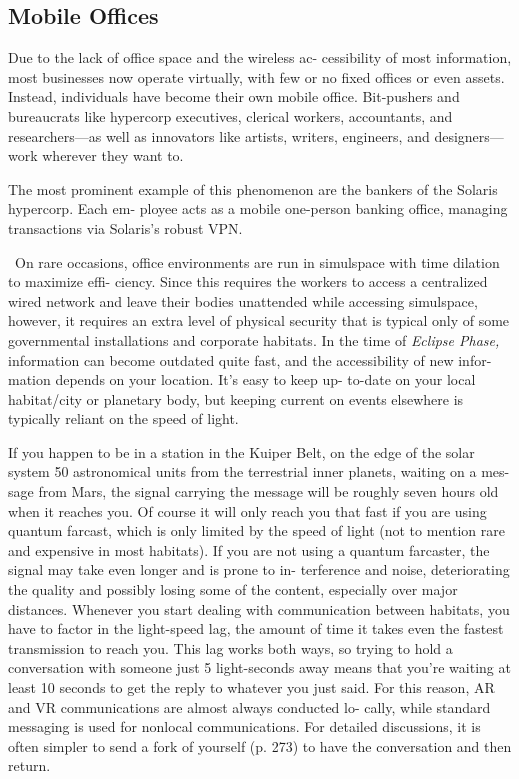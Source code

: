 \subsection{Mobile Offices}

Due to the lack of office space and the wireless ac-
cessibility of most information, most businesses 
now operate virtually, with few or no fixed offices 
or even assets. Instead, individuals have become their 
own mobile office. Bit-pushers and bureaucrats like 
hypercorp executives, clerical workers, accountants, 
and researchers—as well as innovators like artists, 
writers, engineers, and designers—work wherever 
they want to.

The most prominent example of this phenomenon 
are the bankers of the Solaris hypercorp. Each em-
ployee acts as a mobile one-person banking office, 
managing transactions via Solaris's robust VPN.

 On rare occasions, office environments are run 
in simulspace with time dilation to maximize effi-
ciency. Since this requires the workers to access a 
centralized wired network and leave their bodies 
unattended while accessing simulspace, however, it 
requires an extra level of physical security that is 
typical only of some governmental installations and 
corporate habitats.
In the time of \textit{Eclipse Phase,} information can become 
outdated quite fast, and the accessibility of new infor-
mation depends on your location. It's easy to keep up-
to-date on your local habitat/city or planetary body, 
but keeping current on events elsewhere is typically 
reliant on the speed of light.

If you happen to be in a station in the Kuiper Belt, 
on the edge of the solar system 50 astronomical units 
from the terrestrial inner planets, waiting on a mes-
sage from Mars, the signal carrying the message will 
be roughly seven hours old when it reaches you. Of 
course it will only reach you that fast if you are using 
quantum farcast, which is only limited by the speed 
of light (not to mention rare and expensive in most 
habitats). If you are not using a quantum farcaster, 
the signal may take even longer and is prone to in-
terference and noise, deteriorating the quality and 
possibly losing some of the content, especially over 
major distances. Whenever you start dealing with 
communication between habitats, you have to factor 
in the light-speed lag, the amount of time it takes 
even the fastest transmission to reach you. This lag 
works both ways, so trying to hold a conversation 
with someone just 5 light-seconds away means that 
you're waiting at least 10 seconds to get the reply 
to whatever you just said. For this reason, AR and 
VR communications are almost always conducted lo-
cally, while standard messaging is used for nonlocal 
communications. For detailed discussions, it is often 
simpler to send a fork of yourself (p. 273) to have the 
conversation and then return.

